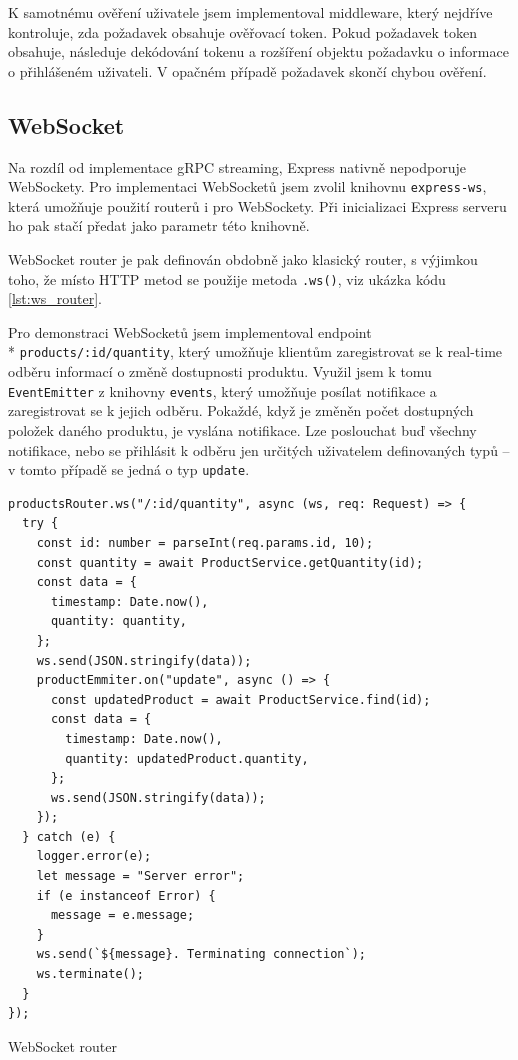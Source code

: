 \documentclass[thesis=M,czech]{FITthesis}[2019/12/23]
\begin{document}
K samotnému ověření uživatele jsem implementoval middleware, který nejdříve kontroluje, zda požadavek obsahuje ověřovací token. Pokud požadavek token obsahuje, následuje dekódování tokenu a rozšíření objektu požadavku o informace o přihlášeném uživateli. V opačném případě požadavek skončí chybou ověření.


\subsection{WebSocket}
Na rozdíl od implementace gRPC streaming, Express nativně nepodporuje WebSockety. Pro implementaci WebSocketů jsem zvolil knihovnu \texttt{express-ws}, která umožňuje použití routerů i pro WebSockety. Při inicializaci Express serveru ho pak stačí předat jako parametr této knihovně.

WebSocket router je pak definován obdobně jako klasický router, s výjimkou toho, že místo HTTP metod se použije metoda \texttt{.ws()}, viz ukázka kódu \ref{lst:ws_router}.

Pro demonstraci WebSocketů jsem implementoval endpoint \\* \texttt{products/:id/quantity}, který umožňuje klientům zaregistrovat se k real-time odběru informací o změně dostupnosti produktu. Využil jsem k tomu \texttt{EventEmitter} z knihovny \texttt{events}, který umožňuje posílat notifikace a zaregistrovat se k jejich odběru. Pokaždé, když je změněn počet dostupných položek daného produktu, je vyslána notifikace. Lze poslouchat buď všechny notifikace, nebo se přihlásit k odběru jen určitých uživatelem definovaných typů -- v tomto případě se jedná o typ \texttt{update}.

\begin{listing}[h]
\begin{verbatim}
productsRouter.ws("/:id/quantity", async (ws, req: Request) => {
  try {
    const id: number = parseInt(req.params.id, 10);
    const quantity = await ProductService.getQuantity(id);
    const data = {
      timestamp: Date.now(),
      quantity: quantity,
    };
    ws.send(JSON.stringify(data));
    productEmmiter.on("update", async () => {
      const updatedProduct = await ProductService.find(id);
      const data = {
        timestamp: Date.now(),
        quantity: updatedProduct.quantity,
      };
      ws.send(JSON.stringify(data));
    });
  } catch (e) {
    logger.error(e);
    let message = "Server error";
    if (e instanceof Error) {
      message = e.message;
    }
    ws.send(`${message}. Terminating connection`);
    ws.terminate();
  }
});
\end{verbatim}
\caption{WebSocket router}
\label{lst:ws_router}
\end{listing}
\end{document}
